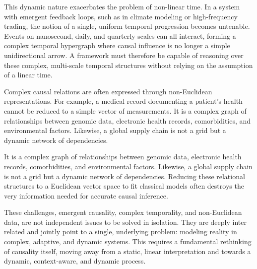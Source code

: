 This dynamic nature exacerbates the problem of non-linear time. In a system with emergent feedback loops, 
such as in climate modeling or high-frequency trading, the notion of a single, uniform temporal progression becomes untenable. 
Events on nanosecond, daily, and quarterly scales can all interact, forming a complex temporal hypergraph where causal influence is no longer a simple unidirectional arrow. 
A framework must therefore be capable of reasoning over these complex, multi-scale temporal structures without relying on the assumption of a linear time. 

Complex causal relations are often expressed through non-Euclidean representations. 
For example, a medical record documenting a patient's health cannot be reduced to a simple vector of measurements. 
It is a complex graph of relationships between genomic data, electronic health records, comorbidities, and environmental factors. 
Likewise, a global supply chain is not a grid but a dynamic network of dependencies.  

It is a complex graph of relationships between genomic data, electronic health records, comorbidities, and environmental factors. 
Likewise, a global supply chain is not a grid but a dynamic network of dependencies. 
Reducing these relational structures to a Euclidean vector space to fit classical models often destroys the very information needed for accurate causal inference. 

These challenges, emergent causality, complex temporality, and non-Euclidean data, are not independent issues to be solved in isolation. 
They are deeply inter related and jointly point to a single, underlying problem: modeling reality in complex, adaptive, and dynamic systems. 
This requires a fundamental rethinking of causality itself, moving away from a static, linear interpretation and towards a dynamic, context-aware, and dynamic process. 

\newpage
 